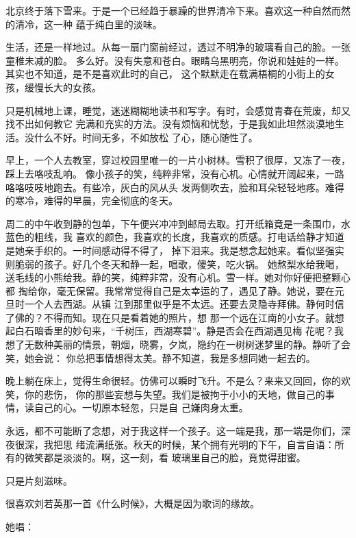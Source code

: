 		北京终于落下雪来。于是一个已经趋于暴躁的世界清冷下来。喜欢这一种自然而然的清冷，这一种
	蕴于纯白里的淡味。

		生活，还是一样地过。从每一扇门窗前经过，透过不明净的玻璃看自己的脸。一张童稚未减的脸。
	多么好。没有失意和苍白。眼睛乌黑明亮，你说和娃娃的一样。其实也不知道，是不是喜欢此时的自己，
	这个默默走在载满梧桐的小街上的女孩，缓慢长大的女孩。

		只是机械地上课，睡觉，迷迷糊糊地读书和写字。有时，会感觉青春在荒废，却又找不出如何教它
	完满和充实的方法。没有烦恼和忧愁，于是我如此坦然淡漠地生活。没什么不好。时间无多，不如放松
	了心，随心随性了。

		早上，一个人去教室，穿过校园里唯一的一片小树林。雪积了很厚，又冻了一夜，踩上去咯吱乱响。
	像小孩子的笑，纯粹非常，没有心机。心情就开阔起来，一路咯咯吱吱地跑去。有些冷，灰白的风从头
	发两侧吹去，脸和耳朵轻轻地疼。难得的寒冷，难得的早晨，完全彻底的冬天。

		周二的中午收到静的包单，下午便兴冲冲到邮局去取。打开纸箱竟是一条围巾，水蓝色的粗线，我
	喜欢的颜色，我喜欢的长度，我喜欢的质感。打电话给静才知道是她亲手织的。一时间感动得不得了，
	掉下泪来。我是想念起她来。看似坚强实则脆弱的孩子。好几个冬天和静一起，唱歌，傻笑，吃火锅。
	她熬梨水给我喝，送毛线的小熊给我。静的笑，纯粹非常，没有心机。雪一样。她对你好便把整颗心都
	掏给你，毫无保留。我常常觉得自己是太幸运的了，遇见了静。她说，要在元旦时一个人去西湖。从镇
	江到那里似乎是不太远。还要去灵隐寺拜佛。静何时信了佛的？不得而知。现在只是看着她的照片，想
	那一个远在江南的小女子。就想起白石暗香里的妙句来，“千树压，西湖寒碧”。静是否会在西湖遇见梅
	花呢？我想了无数种美丽的情景，朝烟，晓雾，夕岚，隐约在一树树迷梦里的静。静听了会笑，她会说：
	你总把事情想得太美。静不知道，我是多想同她一起去的。

		晚上躺在床上，觉得生命很轻。仿佛可以瞬时飞升。不是么？来来又回回，你的欢笑，你的悲伤，
	你的那些妄想与失望。我们是被拘于小小的天地，做自己的事情，读自己的心。一切原本轻忽，只是自
	己嫌肉身太重。

		永远，都不可能断了念想，对于我这样一个孩子。这一端是我，那一端是你们，深夜很深，我把思
	绪流满纸张。秋天的时候，某个拥有光明的下午，自言自语：所有的微笑都是淡淡的。啊，这一刻，看
	玻璃里自己的脸，竟觉得甜蜜。

		只是片刻滋味。

	\endwriting



		很喜欢刘若英那一首《什么时候》，大概是因为歌词的缘故。

		她唱：

